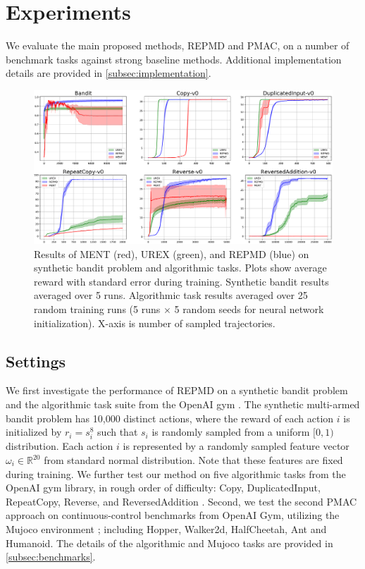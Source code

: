 
\section{Experiments}
\label{sec:experiments}

We evaluate the main proposed methods, REPMD and PMAC,
on a number of benchmark tasks against strong baseline methods.
Additional implementation details are provided in \cref{subsec:implementation}. 

\begin{figure}[t]
\begin{center}
\includegraphics[width=0.75\linewidth]{./fig1.pdf}
\end{center}
\caption{
Results of MENT (red), UREX (green), and REPMD (blue) on synthetic bandit
problem and algorithmic tasks.
Plots show average reward with standard error during training.
Synthetic bandit results averaged over 5 runs.
Algorithmic task results averaged over 25 random training runs
(5 runs $\times$ 5 random seeds for neural network initialization).
X-axis is number of sampled trajectories.
} 
\label{fig:results}
\end{figure}

\subsection{Settings}
\label{subsec:tasks}

We first investigate the performance of REPMD on a synthetic bandit problem
and the algorithmic task suite from the OpenAI gym \citep{brockman2016openai}.
The synthetic multi-armed bandit problem has 10,000 distinct actions,
where
the reward of each action $i$ is initialized by $r_i = s_i^{8}$
such that $s_i$ is randomly sampled from a uniform $[0,1)$ distribution.
Each action $i$ is represented by a randomly sampled feature vector
$\omega_i\in \mathbb{R}^{20}$ from standard normal distribution.
Note that these features are fixed during training.
We further test our method on five algorithmic tasks from the OpenAI gym
library, in rough order of difficulty:
Copy, DuplicatedInput, RepeatCopy, Reverse, and ReversedAddition
\citep{brockman2016openai}.
%
Second, we test the second PMAC approach on continuous-control benchmarks
from OpenAI Gym, utilizing the Mujoco environment
\citep{brockman2016openai,todorov2012mujoco};
including Hopper, Walker2d, HalfCheetah, Ant and Humanoid.
The details of the algorithmic and Mujoco tasks are provided in
\cref{subsec:benchmarks}. 

